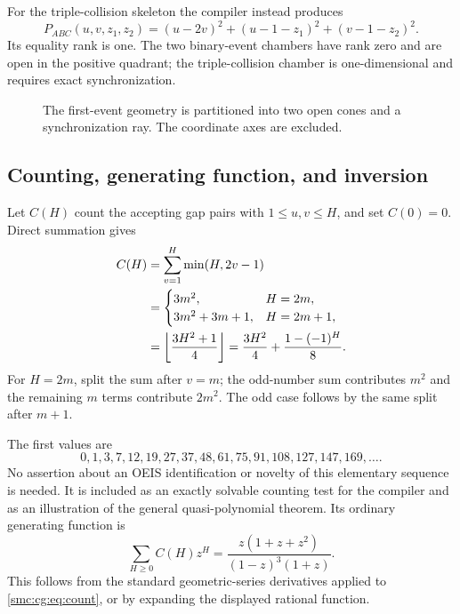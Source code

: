\documentclass[11pt,letterpaper]{article}
\numberwithin{equation}{section}
\theoremstyle{definition}
\theoremstyle{remark}
\newcommand{\floor}[1]{\left\lfloor #1\right\rfloor}
\begin{document}
For the triple-collision skeleton the compiler instead produces
\begin{equation}
 P_{ABC}(u,v,z_1,z_2)=
 (u-2v)^2+(u-1-z_1)^2+(v-1-z_2)^2.
 \label{smc:cg:eq:triplepoly}
\end{equation}
Its equality rank is one. The two binary-event chambers have rank zero and
are open in the positive quadrant; the triple-collision chamber is
one-dimensional and requires exact synchronization.

\begin{figure}[htbp]
\centering
{}
\caption{The first-event geometry is partitioned into two open cones and a
synchronization ray. The coordinate axes are excluded.}
\label{smc:cg:fig:chambers}
\end{figure}

\subsection{Counting, generating function, and inversion}

Let $C(H)$ count the accepting gap pairs with $1\le u,v\le H$, and set
$C(0)=0$. Direct summation gives
\begin{align}
 C(H)&=\sum_{v=1}^H\min(H,2v-1)\notag\\
 &=\begin{cases}
 3m^2,&H=2m,\\
 3m^2+3m+1,&H=2m+1,
 \end{cases}\notag\\
 &=\floor{\frac{3H^2+1}{4}}
  =\frac{3H^2}{4}+\frac{1-(-1)^H}{8}.
 \label{smc:cg:eq:count}
\end{align}
For $H=2m$, split the sum after $v=m$; the odd-number sum contributes $m^2$
and the remaining $m$ terms contribute $2m^2$. The odd case follows by the
same split after $m+1$.

The first values are
\[
 0,1,3,7,12,19,27,37,48,61,75,91,108,127,147,169,\ldots.
\]
No assertion about an OEIS identification or novelty of this elementary
sequence is needed. It is included as an exactly solvable counting test for
the compiler and as an illustration of the general quasi-polynomial theorem.
Its ordinary generating function is
\begin{equation}
 \sum_{H\ge0}C(H)z^H
 =\frac{z(1+z+z^2)}{(1-z)^3(1+z)}.
 \label{smc:cg:eq:gf}
\end{equation}
This follows from the standard geometric-series derivatives applied to
\eqref{smc:cg:eq:count}, or by expanding the displayed rational function.
\end{document}
